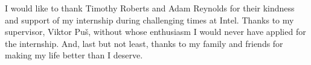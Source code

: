 \documentclass[english,master,unicode]{ctufit-thesis}
\theoremstyle{plain}
\theoremstyle{definition}
\theoremstyle{remark}
\numberwithin{theorem}{chapter}
\begin{document}
\frontmatter\frontmatterinit %


\thispagestyle{empty}\cleardoublepage\maketitle %

\imprintpage %

\tableofcontents %
\listoffigures %
\begingroup
\let\clearpage\relax
\listoftables %

\endgroup %

\lstlistoflistings %

\begin{acknowledgmentpage}
	I would like to thank Timothy Roberts and Adam Reynolds for their kindness
	and support of my internship during challenging times at Intel. Thanks to my
	supervisor, Viktor Puš, without whose enthusiasm I would never have applied
	for the internship. And, last but not least, thanks to my family and friends
	for making my life better than I deserve.
\end{acknowledgmentpage}
\end{document}

